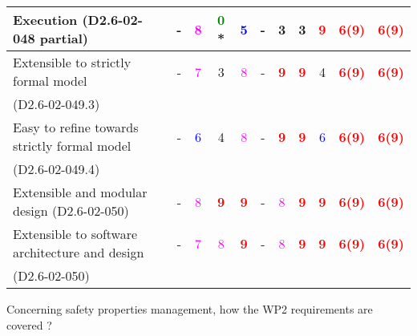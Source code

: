\begin{tabular}{|l | c | c | c | c | c | c | c | c | c | c |}
\hline
Execution (D2.6-02-048 partial) & - & \textcolor{magenta}{8} & \textcolor{green}{0} * & \textcolor{blue}{5} & - & 3     & 3     & \textcolor{red}{\textbf{9}} & \textcolor{red}{\textbf{6(9)}}  & \textcolor{red}{\textbf{6(9)}}  \\
\hline
Extensible to strictly formal model & - & \textcolor{magenta}{7} & 3     & \textcolor{magenta}{8} & - & \textcolor{red}{\textbf{9}} & \textcolor{red}{\textbf{9}} & 4     & \textcolor{red}{\textbf{6(9)}}  & \textcolor{red}{\textbf{6(9)}}  \\
(D2.6-02-049.3)  &  &      &  &  & & &  &    &   &   \\
\hline
Easy to  refine towards strictly formal model & - & \textcolor{blue}{6} & 4     & \textcolor{magenta}{8} & - & \textcolor{red}{\textbf{9}} & \textcolor{red}{\textbf{9}} & \textcolor{blue}{6} & \textcolor{red}{\textbf{6(9)}}  & \textcolor{red}{\textbf{6(9)}}  \\
(D2.6-02-049.4)  &  &      &  &  & & &  &    &   &   \\
\hline
Extensible and modular design (D2.6-02-050) & - & \textcolor{magenta}{8} & \textcolor{red}{\textbf{9}} & \textcolor{red}{\textbf{9}} & - & \textcolor{magenta}{8} & \textcolor{red}{\textbf{9}} & \textcolor{red}{\textbf{9}} & \textcolor{red}{\textbf{6(9)}}  & \textcolor{red}{\textbf{6(9)}}  \\
\hline
Extensible to software architecture and design  & - & \textcolor{magenta}{7} & \textcolor{magenta}{8} & \textcolor{red}{\textbf{9}} & - & \textcolor{magenta}{8} & \textcolor{red}{\textbf{9}} & \textcolor{red}{\textbf{9}} & \textcolor{red}{\textbf{6(9)}}  & \textcolor{red}{\textbf{6(9)}}  \\
(D2.6-02-050) &  &      &  &  & & &  &    &   &   \\
\hline
\end{tabular}

Concerning safety properties management, how the WP2 requirements are covered ?

